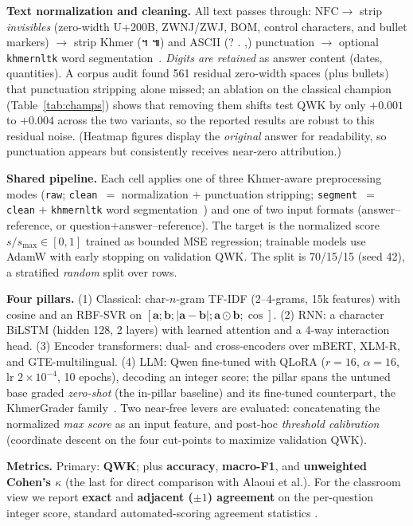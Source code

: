 \documentclass[journal]{IEEEtran}
\begin{document}
\textbf{Text normalization and cleaning.} All text passes through:
$\mathrm{NFC} \rightarrow$ strip \emph{invisibles} (zero-width U+200B, ZWNJ/ZWJ, BOM, control
characters, and bullet markers) $\rightarrow$ strip Khmer
(។ ៕) and ASCII (? . ,) punctuation $\rightarrow$ optional \texttt{khmernltk} word
segmentation~\cite{khmernltk2020}. \emph{Digits are retained} as answer content (dates,
quantities). A corpus audit found 561 residual zero-width spaces (plus bullets) that punctuation
stripping alone missed; an ablation on the classical champion (Table~\ref{tab:champs}) shows that
removing them shifts test QWK by only $+0.001$ to $+0.004$ across the two variants, so the
reported results are robust to this residual noise. (Heatmap figures
display the \emph{original} answer for readability, so punctuation appears but consistently
receives near-zero attribution.)

\textbf{Shared pipeline.} Each cell applies one of three Khmer-aware preprocessing modes
(\texttt{raw}; \texttt{clean}~$=$ normalization $+$ punctuation stripping; \texttt{segment}~$=$
\texttt{clean} $+$ \texttt{khmernltk} word segmentation~\cite{khmernltk2020}) and one of two input
formats (answer--reference, or question$+$answer--reference). The target is the normalized score
$s/s_{\max}\in[0,1]$ trained as bounded MSE regression; trainable models use AdamW with
early stopping on validation QWK. The split is 70/15/15 (seed 42), a stratified \emph{random}
split over rows.

\textbf{Four pillars.} (1) Classical: char-$n$-gram TF-IDF (2--4-grams, 15k features) with cosine
and an RBF-SVR on $[\mathbf{a};\mathbf{b};|\mathbf{a}-\mathbf{b}|;\mathbf{a}\odot\mathbf{b};\cos]$.
(2) RNN: a character BiLSTM (hidden 128, 2 layers) with learned attention and a 4-way interaction
head. (3) Encoder transformers: dual- and cross-encoders over mBERT, XLM-R, and GTE-multilingual.
(4) LLM: Qwen fine-tuned with QLoRA ($r{=}16$, $\alpha{=}16$, lr $2{\times}10^{-4}$, 10 epochs),
decoding an integer score; the pillar spans the untuned base graded \emph{zero-shot} (the in-pillar
baseline) and its fine-tuned counterpart, the KhmerGrader family~\cite{latif2024finetuning}. Two
near-free levers are evaluated: concatenating the normalized
\emph{max score} as an input feature, and post-hoc \emph{threshold calibration} (coordinate
descent on the four cut-points to maximize validation QWK).

\textbf{Metrics.} Primary: \textbf{QWK}; plus \textbf{accuracy}, \textbf{macro-F1}, and
\textbf{unweighted Cohen's $\kappa$} (the last for direct comparison with Alaoui et al.). For the
classroom view we report \textbf{exact} and \textbf{adjacent ($\pm1$) agreement} on the
per-question integer score, standard automated-scoring agreement statistics
\cite{williamson2012framework}.
\end{document}
